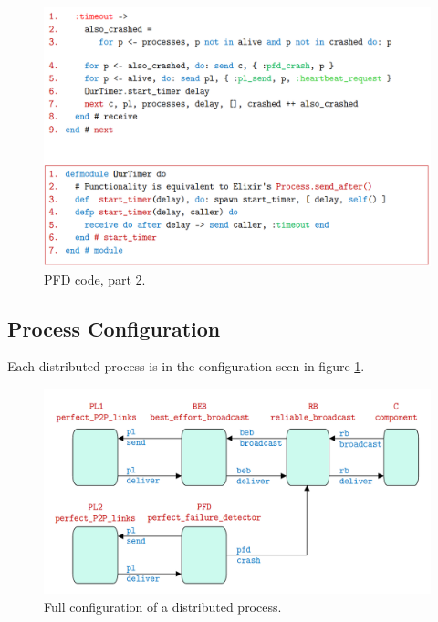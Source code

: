 \documentclass[11pt]{article}
\begin{document}
\begin{figure}[htb!]
  \centering
  \caption{PFD code, part 2.}
  \includegraphics[scale=0.3]{pfdcode2}
\end{figure}


\subsection{Process Configuration}
Each distributed process is in the configuration seen in figure \ref{fig:processconf}.

\begin{figure}[htb!]
  \centering
  \caption{Full configuration of a distributed process.}
  \label{fig:processconf}
  \includegraphics[scale=0.3]{processconf}
\end{figure}
\end{document}
